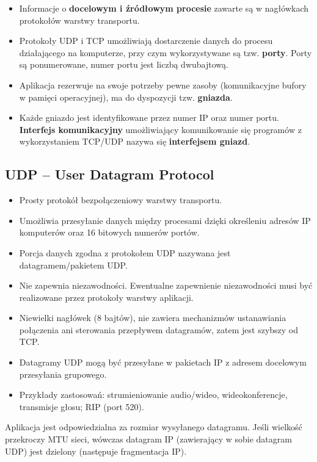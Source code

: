 \documentclass[../main.tex]{subfiles}
\begin{document}
    \begin{itemize}
        \item Informacje o \textbf{docelowym i źródłowym procesie} zawarte są w nagłówkach protokołów warstwy transportu.
        \item Protokoły UDP i TCP umożliwiają dostarczenie danych do procesu działającego na komputerze, przy czym wykorzystywane są tzw. \textbf{porty}. Porty są ponumerowane, numer portu jest liczbą
        dwubajtową.
        \item Aplikacja rezerwuje na swoje potrzeby pewne zasoby (komunikacyjne bufory w pamięci
        operacyjnej), ma do dyspozycji tzw. \textbf{gniazda}.
        \item Każde gniazdo jest identyfikowane przez numer IP oraz numer portu. \textbf{Interfejs komunikacyjny}  umożliwiający komunikowanie się programów z wykorzystaniem TCP/UDP nazywa się \textbf{interfejsem gniazd}.
    \end{itemize}

    \subsection{UDP – User Datagram Protocol}
    \begin{itemize}
        \item Prosty protokół bezpołączeniowy warstwy transportu.
        \item Umożliwia przesyłanie danych między procesami dzięki określeniu adresów IP komputerów oraz 16 bitowych numerów portów.
        \item Porcja danych zgodna z protokołem UDP nazywana jest datagramem/pakietem UDP.
        \item Nie zapewnia niezawodności. Ewentualne zapewnienie niezawodności musi być realizowane przez protokoły warstwy aplikacji.
        \item Niewielki nagłówek (8 bajtów), nie zawiera mechanizmów ustanawiania połączenia ani sterowania przepływem datagramów, zatem jest szybszy od TCP.
        \item Datagramy UDP mogą być przesyłane w pakietach IP z adresem docelowym przesyłania grupowego.
        \item Przykłady zastosowań: strumieniowanie audio/wideo, wideokonferencje, transmisje głosu; RIP (port 520).
    \end{itemize}

    Aplikacja jest odpowiedzialna za rozmiar wysyłanego datagramu. Jeśli wielkość przekroczy
    MTU sieci, wówczas datagram IP (zawierający w sobie datagram UDP) jest dzielony
    (następuje fragmentacja IP).
\end{document}
